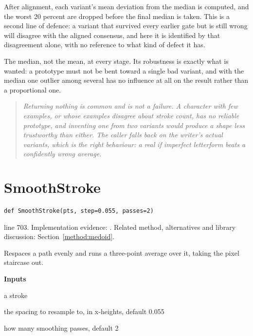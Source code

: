 After alignment, each variant's mean deviation from the median is computed, and the worst 20 percent are dropped before the final median is taken. This is a second line of defence: a variant that survived every earlier gate but is still wrong will disagree with the aligned consensus, and here it is identified by that disagreement alone, with no reference to what kind of defect it has.

The median, not the mean, at every stage. Its robustness is exactly what is wanted: a prototype must not be bent toward a single bad variant, and with the median one outlier among several has no influence at all on the result rather than a proportional one.


\begin{quote}\small\itshape Returning nothing is common and is not a failure. A character with few examples, or whose examples disagree about stroke count, has no reliable prototype, and inventing one from two variants would produce a shape less trustworthy than either. The caller falls back on the writer's actual variants, which is the right behaviour: a real if imperfect letterform beats a confidently wrong average.\end{quote}


\section{SmoothStroke}\label{fn:style:SmoothStroke}
\begin{lstlisting}[style=sig]
def SmoothStroke(pts, step=0.055, passes=2)
\end{lstlisting}
 line 703. Implementation evidence: \cite{code2026}. Related method, alternatives and library discussion: Section~\ref{method:medoid}.


Respaces a path evenly and runs a three-point average over it, taking the pixel staircase out.




\noindent\textbf{Inputs}
\begin{description}[leftmargin=2.2em,style=nextline,font=\normalfont\ttfamily]\setlength\itemsep{1pt}
  \item[{pts}] \normalfont a stroke
  \item[{step}] \normalfont the spacing to resample to, in x-heights, default 0.055
  \item[{passes}] \normalfont how many smoothing passes, default 2
\end{description}

